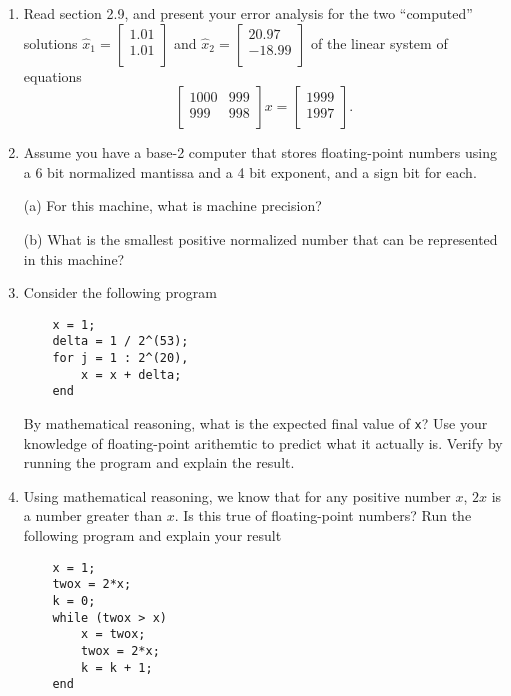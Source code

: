 {\begin{enumerate}
\item Read section 2.9, and present your error analysis for the two 
``computed'' solutions
$\widehat x_1 = 
\left[ \begin{array}{r}
1.01 \\ 
1.01 \\ 
\end{array} \right]$ and 
$\widehat x_2 = 
\left[ \begin{array}{r}
20.97 \\ 
-18.99 \\ 
\end{array} \right]$ 
of the linear system of equations 
\[
\left[ \begin{array}{rr}
1000 & 999 \\ 
999  & 998 \\ 
\end{array} \right] x = 
\left[ \begin{array}{r}
1999  \\ 
1997 \\ 
\end{array} \right].
\] 

\item Assume you have a base-2 computer that stores floating-point
numbers using a 6 bit normalized mantissa and a 4 bit
exponent, and a sign bit for each.

(a) For this machine, what is machine precision?

(b) What is the smallest positive normalized number that can be
represented in this machine?

\item Consider the following program
\vspace{-.1in}
\begin{verbatim} 
    x = 1; 
    delta = 1 / 2^(53); 
    for j = 1 : 2^(20),
        x = x + delta; 
    end
\end{verbatim}
\vspace{-.2in}
By mathematical reasoning, what is the expected final value of {\tt x}?
Use your knowledge of floating-point arithemtic to predict what it actually is. 
Verify by running the program and explain the result. 

\item Using mathematical reasoning, we know that for any positive number $x$, 
$2x$ is a number greater than $x$. Is this true of floating-point numbers? 
Run the following program and explain your result
\vspace{-.1in}
\begin{verbatim}  
    x = 1; 
    twox = 2*x; 
    k = 0; 
    while (twox > x)
        x = twox; 
        twox = 2*x; 
        k = k + 1;  
    end
\end{verbatim}


\end{enumerate}}
